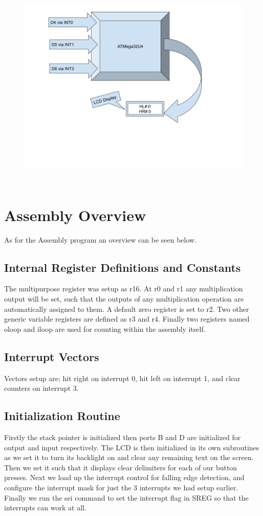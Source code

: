 \documentclass[12pt,letterpaper]{article}
\begin{document}
\begin{figure}[h]
	\includegraphics[width=12cm, height=10cm]{Block Diagram L5.jpg}
	\centering
\end{figure}
	
\section{Assembly Overview}
As for the Assembly program an overview can be seen below. 

\subsection{Internal Register Definitions and Constants}
The multipurpose register was setup as r16. At r0 and r1 any multiplication output will be set, such that the outputs of any multiplication operation are automatically assigned to them. A default zero register is set to r2. Two other generic variable registers are defined as r3 and r4. Finally two registers named oloop and iloop are used for counting within the assembly itself.

\subsection{Interrupt Vectors}
Vectors setup are;
hit right on interrupt 0,
hit left on interrupt 1,
and clear counters on interrupt 3.



\subsection{Initialization Routine}
Firstly the stack pointer is initialized then ports B and D are initialized for output and input respectively. The LCD is then initialized in its own subroutines as we set it to turn its backlight on and clear any remaining text on the screen. Then we set it such that it displays clear delimiters for each of our button presses. Next we load up the interrupt control for falling edge detection, and configure the interrupt mask for just the 3 interrupts we had setup earlier. Finally we run the sei command to set the interrupt flag in SREG so that the interrupts can work at all.
\end{document}
